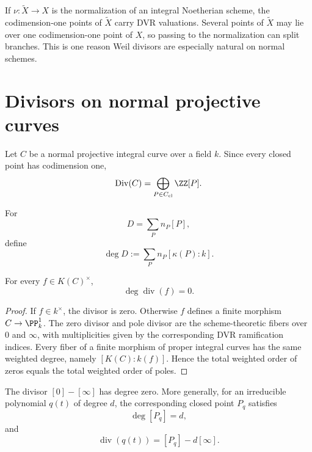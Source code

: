\begin{remark}\label{rem:vi39-normalization}
If \(\nu:\widetilde X\to X\) is the normalization of an integral Noetherian scheme, the codimension-one points of \(\widetilde X\) carry DVR valuations.  Several points of \(\widetilde X\) may lie over one codimension-one point of \(X\), so passing to the normalization can split branches.  This is one reason Weil divisors are especially natural on normal schemes.
\end{remark}

\section{Divisors on normal projective curves}
Let \(C\) be a normal projective integral curve over a field \(k\).  Since every closed point has codimension one,
\[
 \Div(C)=\bigoplus_{P\in C_{\mathrm{cl}}}\ZZ[P].
\]

\begin{definition}\label{def:vi39-curve-degree}
For
\[
 D=\sum_P n_P[P],
\]
define
\[
 \deg D:=\sum_P n_P[\kappa(P):k].
\]
\end{definition}

\begin{theorem}\label{thm:vi39-degree-zero}
For every \(f\in K(C)^\times\),
\[
 \deg\operatorname{div}(f)=0.
\]
\end{theorem}

\begin{proof}
If \(f\in k^\times\), the divisor is zero.  Otherwise \(f\) defines a finite morphism \(C\to\PP^1_k\).  The zero divisor and pole divisor are the scheme-theoretic fibers over \(0\) and \(\infty\), with multiplicities given by the corresponding DVR ramification indices.  Every fiber of a finite morphism of proper integral curves has the same weighted degree, namely \([K(C):k(f)]\).  Hence the total weighted order of zeros equals the total weighted order of poles.
\end{proof}

\begin{example}[Degree on \(\PP^1\)]\label{ex:vi39-p1-degree}
The divisor \([0]-[\infty]\) has degree zero.  More generally, for an irreducible polynomial \(q(t)\) of degree \(d\), the corresponding closed point \(P_q\) satisfies
\[
 \deg[P_q]=d,
\]
and
\[
 \operatorname{div}(q(t))=[P_q]-d[\infty].
\]
\end{example}


